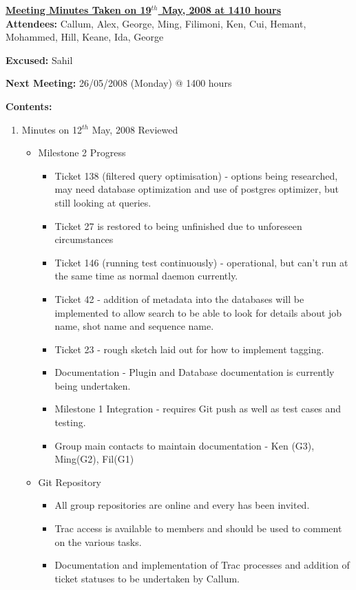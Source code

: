 \documentclass{letter}
\begin{document}
{\large \textbf{\underline{Meeting Minutes Taken on 19$^{th}$ May, 2008 at 1410 hours}}}\\

\textbf{Attendees:} Callum, Alex, George, Ming, Filimoni, Ken, Cui, Hemant, Mohammed, Hill, Keane, Ida, George 

\textbf{Excused:} Sahil

\textbf{Next Meeting:} 26/05/2008 (Monday) @ 1400 hours

\textbf{Contents:}

\begin{enumerate}
\item Minutes on 12$^{th}$ May, 2008 Reviewed
	\begin{itemize}
		\item Milestone 2 Progress 
			\begin{itemize}
				\item Ticket 138 (filtered query optimisation) - options being researched, may need database optimization and use of postgres optimizer, but still looking at queries.
				\item Ticket 27 is restored to being unfinished due to unforeseen circumstances
				\item Ticket 146 (running test continuously) - operational, but can't run at the same time as normal daemon currently.
				\item Ticket 42 - addition of metadata into the databases will be implemented to allow search to be able to look for details about job name, shot name and sequence name.
				\item Ticket 23 - rough sketch laid out for how to implement tagging.
				\item Documentation - Plugin and Database documentation is currently being undertaken.
				\item Milestone 1 Integration - requires Git push as well as test cases and testing.
				\item Group main contacts to maintain documentation - Ken (G3), Ming(G2), Fil(G1)
			\end{itemize}
		\item Git Repository
			\begin{itemize}
				\item All group repositories are online and every has been invited.
				\item Trac access is available to members and should be used to comment on the various tasks.
				\item Documentation and implementation of Trac processes and addition of ticket statuses to be undertaken by Callum.

\end{itemize}
\end{itemize}
\end{enumerate}
\end{document}
